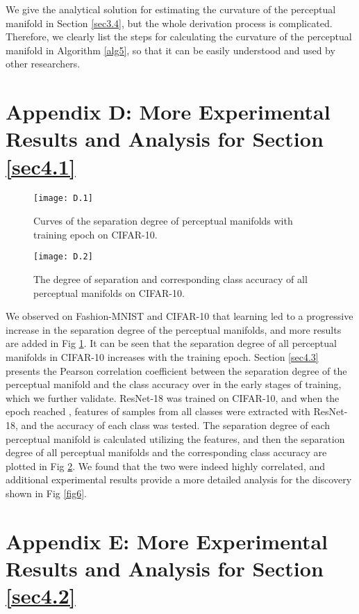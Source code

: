 \documentclass[10pt,twocolumn,letterpaper]{article}
\begin{document}
We give the analytical solution for estimating the curvature of the perceptual manifold in Section \ref{sec3.4}, but the whole derivation process is complicated. Therefore, we clearly list the steps for calculating the curvature of the perceptual manifold in Algorithm \ref{alg5}, so that it can be easily understood and used by other researchers.

\section*{Appendix D: More Experimental Results and Analysis for Section \ref{sec4.1}}
\label{secD}

\begin{figure}[t]
\centering
\centerline{\texttt{[image: D.1]}}
\vskip -0.1in
\caption{Curves of the separation degree of perceptual manifolds with training epoch on CIFAR-10.}
\label{fig10}
\vskip -0.2in
\end{figure}

\begin{figure}[t]
\centering
\centerline{\texttt{[image: D.2]}}
\vskip -0.1in
\caption{The degree of separation and corresponding class accuracy of all perceptual manifolds on CIFAR-10.}
\label{fig11}
\vskip -0.1in
\end{figure}

We observed on Fashion-MNIST and CIFAR-10 that learning led to a progressive increase in the separation degree of the perceptual manifolds, and more results are added in Fig \ref{fig10}. It can be seen that the separation degree of all perceptual manifolds in CIFAR-10 increases with the training epoch. Section \ref{sec4.3} presents the Pearson correlation coefficient between the separation degree of the perceptual manifold and the class accuracy over  in the early stages of training, which we further validate. ResNet-18 was trained on CIFAR-10, and when the epoch reached , features of samples from all classes were extracted with ResNet-18, and the accuracy of each class was tested. The separation degree of each perceptual manifold is calculated utilizing the features, and then the separation degree of all perceptual manifolds and the corresponding class accuracy are plotted in Fig \ref{fig11}. We found that the two were indeed highly correlated, and additional experimental results provide a more detailed analysis for the discovery shown in Fig \ref{fig6}.


\section*{Appendix E: More Experimental Results and Analysis for Section \ref{sec4.2}}
\label{secE}
\end{document}
